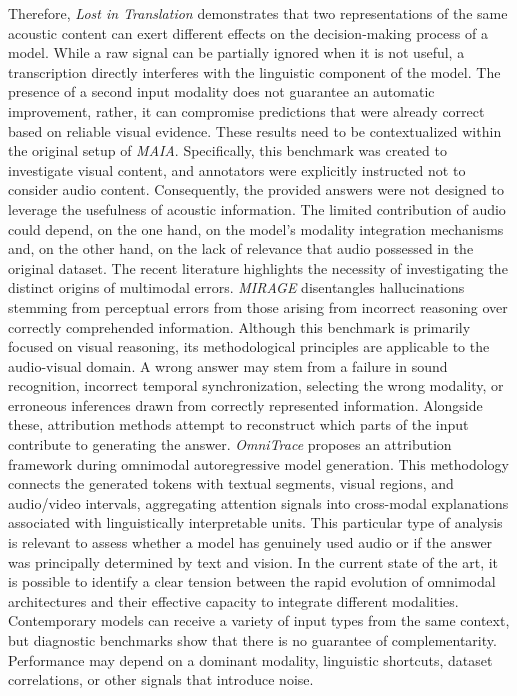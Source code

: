 Therefore, \textit{Lost in Translation} demonstrates that two representations of the same acoustic content can exert different effects on the decision-making process of a model.
While a raw signal can be partially ignored when it is not useful, a transcription directly interferes with the linguistic component of the model. The presence of a second input modality does not guarantee an automatic improvement, rather, it can compromise predictions that were already correct based on reliable visual evidence.
These results need to be contextualized within the original setup of \textit{MAIA}. Specifically, this benchmark was created to investigate visual content, and annotators were explicitly instructed not to consider audio content. Consequently, the provided answers were not designed to leverage the usefulness of acoustic information. The limited contribution of audio could depend, on the one hand, on the model's modality integration mechanisms and, on the other hand, on the lack of relevance that audio possessed in the original dataset.
The recent literature highlights the necessity of investigating the distinct origins of multimodal errors. \textit{MIRAGE} \cite{dong2025mirage} disentangles hallucinations stemming from perceptual errors from those arising from incorrect reasoning over correctly comprehended information. Although this benchmark is primarily focused on visual reasoning, its methodological principles are applicable to the audio-visual domain. A wrong answer may stem from a failure in sound recognition, incorrect temporal synchronization, selecting the wrong modality, or erroneous inferences drawn from correctly represented information.
Alongside these, attribution methods attempt to reconstruct which parts of the input contribute to generating the answer. \textit{OmniTrace} proposes an attribution framework during omnimodal autoregressive model generation. This methodology connects the generated tokens with textual segments, visual regions, and audio/video intervals, aggregating attention signals into cross-modal explanations associated with linguistically interpretable units. This particular type of analysis is relevant to assess whether a model has genuinely used audio or if the answer was principally determined by text and vision.
In the current state of the art, it is possible to identify a clear tension between the rapid evolution of omnimodal architectures and their effective capacity to integrate different modalities. Contemporary models can receive a variety of input types from the same context, but diagnostic benchmarks show that there is no guarantee of complementarity. Performance may depend on a dominant modality, linguistic shortcuts, dataset correlations, or other signals that introduce noise.
